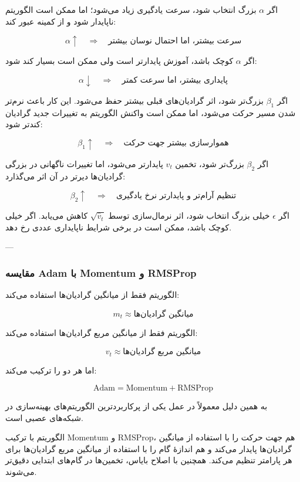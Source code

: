 \documentclass[12pt,a4paper]{article}
\begin{document}
اگر \(\alpha\) بزرگ انتخاب شود، سرعت یادگیری زیاد می‌شود؛ اما ممکن است الگوریتم ناپایدار شود و از کمینه عبور کند:

\[
\alpha \uparrow
\quad \Longrightarrow \quad
\text{سرعت بیشتر، اما احتمال نوسان بیشتر}
\]

اگر \(\alpha\) کوچک باشد، آموزش پایدارتر است ولی ممکن است بسیار کند شود:

\[
\alpha \downarrow
\quad \Longrightarrow \quad
\text{پایداری بیشتر، اما سرعت کمتر}
\]

اگر \(\beta_1\) بزرگ‌تر شود، اثر گرادیان‌های قبلی بیشتر حفظ می‌شود. این کار باعث نرم‌تر شدن مسیر حرکت می‌شود، اما ممکن است واکنش الگوریتم به تغییرات جدید گرادیان کندتر شود:

\[
\beta_1 \uparrow
\quad \Longrightarrow \quad
\text{هموارسازی بیشتر جهت حرکت}
\]

اگر \(\beta_2\) بزرگ‌تر شود، تخمین \(v_t\) پایدارتر می‌شود، اما تغییرات ناگهانی در بزرگی گرادیان‌ها دیرتر در آن اثر می‌گذارد:

\[
\beta_2 \uparrow
\quad \Longrightarrow \quad
\text{تنظیم آرام‌تر و پایدارتر نرخ یادگیری}
\]

اگر \(\epsilon\) خیلی بزرگ انتخاب شود، اثر نرمال‌سازی توسط \(\sqrt{\hat{v}_t}\) کاهش می‌یابد. اگر خیلی کوچک باشد، ممکن است در برخی شرایط ناپایداری عددی رخ دهد.

---

\subsubsection{مقایسه Adam با Momentum و RMSProp}

الگوریتم  فقط از میانگین گرادیان‌ها استفاده می‌کند:

\[
m_t \approx \text{میانگین گرادیان‌ها}
\]

الگوریتم  فقط از میانگین مربع گرادیان‌ها استفاده می‌کند:

\[
v_t \approx \text{میانگین مربع گرادیان‌ها}
\]

اما  هر دو را ترکیب می‌کند:

\[
\text{Adam}
=
\text{Momentum}
+
\text{RMSProp}
\]

به همین دلیل  معمولاً در عمل یکی از پرکاربردترین الگوریتم‌های بهینه‌سازی در شبکه‌های عصبی است.

\begin{tcolorbox}[
	colback=softorange,
	colframe=golden,
	title=جمع‌بندی بخش Adam,
	coltitle=black
	]
	الگوریتم  با ترکیب Momentum و RMSProp، هم جهت حرکت را با استفاده از میانگین گرادیان‌ها پایدار می‌کند و هم اندازهٔ گام را با استفاده از میانگین مربع گرادیان‌ها برای هر پارامتر تنظیم می‌کند. همچنین با اصلاح بایاس، تخمین‌ها در گام‌های ابتدایی دقیق‌تر می‌شوند.
\end{tcolorbox}
\end{document}
